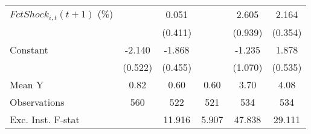{\begin{tabular}{l*{5}{c}}
\addlinespace
$ FctShock_{i,t}(t+1)$ (\%)&                     &       0.051         &                     &       2.605\sym{***}&       2.164\sym{***}\\
                    &                     &     (0.411)         &                     &     (0.939)         &     (0.354)         \\
\addlinespace
Constant            &      -2.140\sym{***}&      -1.868\sym{***}&                     &      -1.235         &       1.878\sym{***}\\
                    &     (0.522)         &     (0.455)         &                     &     (1.070)         &     (0.535)         \\
\midrule
Mean Y              &        0.82         &        0.60         &        0.60         &        3.70         &        4.08         \\
Observations        &         560         &         522         &         521         &         534         &         534         \\
Exc. Inst. F-stat   &                     &      11.916         &       5.907         &      47.838         &      29.111         \\
\bottomrule
\end{tabular}
}
